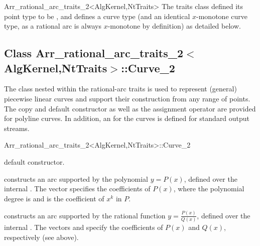 \begin{ccRefClass}{Arr_rational_arc_traits_2<AlgKernel,NtTraits>}
The traits class defined its point type to be ,
and defines a curve type (and an identical $x$-monotone curve type, as 
a rational arc is always $x$-monotone by definition) as detailed below.


\ccIsModel

\subsection*{Class
         Arr\_rational\_arc\_traits\_2$<$AlgKernel,NtTraits$>$::Curve\_2}

The  class nested within the rational-arc traits is used to
represent (general) piecewise linear curves and support their construction
from any range of points. The copy and default constructor as well as 
the assignment operator are provided for polyline curves. In addition, 
an  for the curves is defined for standard output streams.

\begin{ccClass}{Arr_rational_arc_traits_2<AlgKernel,NtTraits>::Curve_2}

\ccTypes



\ccCreation
{}

  {default constructor.}

  {constructs an arc supported by the polynomial $y = P(x)$, defined over
   the internal . The vector  specifies
   the coefficients of $P(x)$, where the polynomial degree is
    and  is the coefficient of $x^k$ in $P$.
   }

  {constructs an arc supported by the rational function
   $y = \frac{P(x)}{Q(x)}$, defined over the internal .
   The vectors  and  specify the coefficients
   of $P(x)$ and $Q(x)$, respectively (see above).
   }


\end{ccClass}
\end{ccRefClass}

